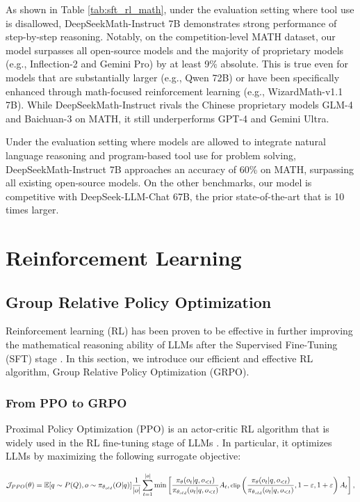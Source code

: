 \endgroup As shown in Table \ref{tab:sft_rl_math}, under the evaluation setting where tool use is disallowed, DeepSeekMath-Instruct 7B demonstrates strong performance of step-by-step reasoning. Notably, on the competition-level MATH dataset, our model surpasses all open-source models and the majority of proprietary models (e.g., Inflection-2 and Gemini Pro) by at least 9\% absolute. This is true even for models that are substantially larger (e.g., Qwen 72B) or have been specifically enhanced through math-focused reinforcement learning (e.g., WizardMath-v1.1 7B). While DeepSeekMath-Instruct rivals the Chinese proprietary models GLM-4 and Baichuan-3 on MATH, it still underperforms GPT-4 and Gemini Ultra.

Under the evaluation setting where models are allowed to integrate natural language reasoning and program-based tool use for problem solving, DeepSeekMath-Instruct 7B approaches an accuracy of 60\% on MATH, surpassing all existing open-source models. On the other benchmarks, our model is competitive with DeepSeek-LLM-Chat 67B, the prior state-of-the-art that is 10 times larger.
\section{Reinforcement Learning}

\subsection{Group Relative Policy Optimization} Reinforcement learning (RL) has been proven to be effective in further improving the mathematical reasoning ability of LLMs after the Supervised Fine-Tuning (SFT) stage \citep{wang2023math,wizardmath}. In this section, we introduce our efficient and effective RL algorithm, Group Relative Policy Optimization (GRPO).

\subsubsection{From PPO to GRPO} Proximal Policy Optimization (PPO) \citep{schulman2017proximal} is an actor-critic RL algorithm that is widely used in the RL fine-tuning stage of LLMs \citep{ouyang2022training}. In particular, it optimizes LLMs by maximizing the following surrogate objective:

\begin{equation}
\footnotesize
    \mathcal{J}_{PPO}(\theta) = \mathbb{E}{[q \sim P(Q), o \sim \pi_{\theta_{old}}(O|q)]} \frac{1}{|o|} \sum_{t=1}^{|o|} \min \left[ \frac{\pi_\theta(o_{t} | q, o_{<t})}{\pi_{\theta_{old}}(o_{t} | q, o_{<t})} A_{t}, \text{clip} \left( \frac{\pi_\theta(o_{t} | q, o_{<t})}{\pi_{\theta_{old}}(o_{t} | q, o_{<t})}, 1 - \varepsilon, 1 + \varepsilon \right)  A_{t} \right] ,
\end{equation}

